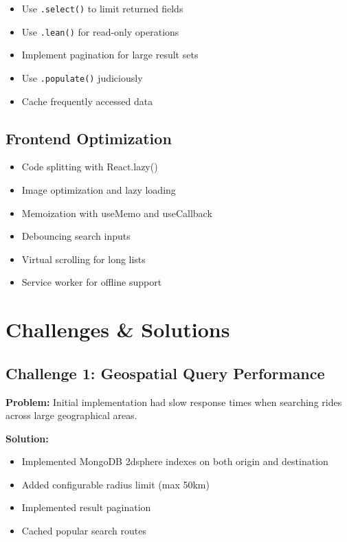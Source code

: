 \documentclass[12pt,a4paper]{article}
\begin{document}
\begin{itemize}
    \item Use \texttt{.select()} to limit returned fields
    \item Use \texttt{.lean()} for read-only operations
    \item Implement pagination for large result sets
    \item Use \texttt{.populate()} judiciously
    \item Cache frequently accessed data
\end{itemize}

\subsection{Frontend Optimization}

\begin{itemize}
    \item Code splitting with React.lazy()
    \item Image optimization and lazy loading
    \item Memoization with useMemo and useCallback
    \item Debouncing search inputs
    \item Virtual scrolling for long lists
    \item Service worker for offline support
\end{itemize}

\newpage

\section{Challenges \& Solutions}

\subsection{Challenge 1: Geospatial Query Performance}

\textbf{Problem:} Initial implementation had slow response times when searching rides across large geographical areas.

\textbf{Solution:}
\begin{itemize}
    \item Implemented MongoDB 2dsphere indexes on both origin and destination
    \item Added configurable radius limit (max 50km)
    \item Implemented result pagination
    \item Cached popular search routes
\end{itemize}
\end{document}
